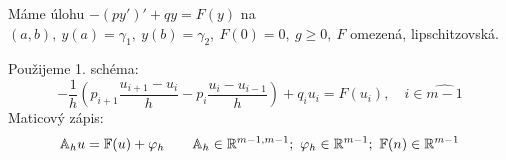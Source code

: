 	Máme úlohu $ -(py')' + qy = F(y) $ na $(a,b),\ y(a)= \gamma_1,\ y(b)= \gamma_2,\ F(0) = 0,\ 
	g \geq 0,\ F$ omezená, lipschitzovská.
	
	Použijeme 1. schéma:
	$$ -\frac{1}{h} \left( p_{i+1} \frac{u_{i+1} - u_i}{h} - p_{i} \frac{u_i - u_{i-1}}{h} \right)
	+ q_i u_i = F(u_i), \quad i \in \widehat{m-1} $$
	Maticový zápis:
	$$ \bbA_h u= \bbF(u)+\varphi_h \qquad \bbA_h \in \R^{m-1,m-1};\ \varphi_h \in \R^{m-1};\ 
	\bbF(n) \in \R ^{m-1} $$
	

